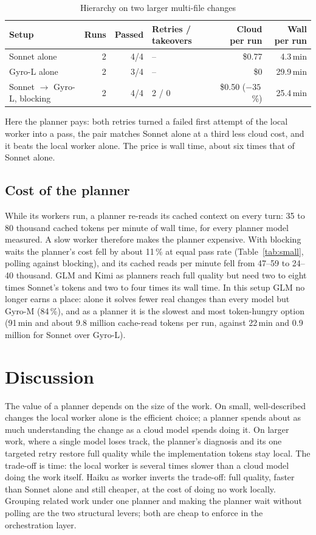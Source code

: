\begin{table}[H]
\centering
\small
\caption{Hierarchy on two larger multi-file changes}\label{tab:large}
\begin{tabular}{lrrlrr}
\toprule
Setup & Runs & Passed & Retries / takeovers & Cloud per run & Wall per run \\
\midrule
Sonnet alone & 2 & 4/4 & -- & \$0.77 & 4.3\,min \\
Gyro-L alone & 2 & 3/4 & -- & \$0 & 29.9\,min \\
Sonnet $\rightarrow$ Gyro-L, blocking & 2 & 4/4 & 2 / 0 & \$0.50 ($-35$\,\%) & 25.4\,min \\
\bottomrule
\end{tabular}
\end{table}

Here the planner pays: both retries turned a failed first attempt of the local worker into a pass, the pair
matches Sonnet alone at a third less cloud cost, and it beats the local worker alone. The price is wall time, about
six times that of Sonnet alone.

\subsection{Cost of the planner}

While its workers run, a planner re-reads its cached context on every turn: 35 to 80 thousand cached tokens per
minute of wall time, for every planner model measured. A slow worker therefore makes the planner expensive. With
blocking waits the planner's cost fell by about 11\,\% at equal pass rate (Table~\ref{tab:small}, polling against
blocking), and its cached reads per minute fell from 47--59 to 24--40 thousand. GLM and Kimi as planners reach full
quality but need two to eight times Sonnet's tokens and two to four times its wall time. In this setup GLM no longer
earns a place: alone it solves fewer real changes than every model but Gyro-M (84\,\%), and as a planner it is the
slowest and most token-hungry option (91\,min and about 9.8 million cache-read tokens per run, against 22\,min and
0.9 million for Sonnet over Gyro-L).

\section{Discussion}\label{sec:discussion}

The value of a planner depends on the size of the work. On small, well-described changes the local worker alone is
the efficient choice; a planner spends about as much understanding the change as a cloud model spends doing it.
On larger work, where a single model loses track, the planner's diagnosis and its one targeted retry restore full
quality while the implementation tokens stay local. The trade-off is time: the local worker is several times slower
than a cloud model doing the work itself. Haiku as worker inverts the trade-off: full quality, faster than Sonnet
alone and still cheaper, at the cost of doing no work locally. Grouping related work under one planner and making
the planner wait without polling are the two structural levers; both are cheap to enforce in the orchestration
layer.

